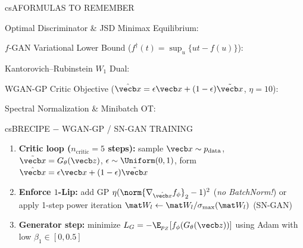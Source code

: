 \documentclass[../../../../master.tex]{subfiles}
\begin{document}
\begin{cscolumns}
\begin{cscard}{csA}{FORMULAS TO REMEMBER}
  \begin{csbul}
    \item Optimal Discriminator \& JSD Minimax Equilibrium:
    \item $f$-GAN Variational Lower Bound ($f^\dagger(t)=\sup_u\{ut-f(u)\}$):
    \item Kantorovich--Rubinstein $W_1$ Dual:
    \item WGAN-GP Critic Objective ($\hat{\vecb x}=\epsilon\vecb x+(1-\epsilon)\tilde{\vecb x}$, $\eta=10$):
    \item Spectral Normalization \& Minibatch OT:
  \end{csbul}
\end{cscard}

\begin{cscard}{csB}{RECIPE $-$ WGAN-GP / SN-GAN TRAINING}
  \begin{enumerate}[leftmargin=1.2em, itemsep=1pt, topsep=1pt, parsep=0pt]
    \item \textbf{Critic loop ($n_{\mathrm{critic}}=5$ steps):} sample $\vecb x\sim p_{\mathrm{data}}$, $\tilde{\vecb x}=G_\theta(\vecb z)$, $\epsilon\sim\Uniform(0,1)$, form $\hat{\vecb x}=\epsilon\vecb x+(1-\epsilon)\tilde{\vecb x}$
    \item \textbf{Enforce $1$-Lip:} add GP $\eta(\norm{\nabla_{\hat{\vecb x}}f_\phi}_2-1)^2$ (\emph{no BatchNorm!}) or apply 1-step power iteration $\mat W_l\leftarrow\mat W_l/\sigma_{\max}(\mat W_l)$ (SN-GAN)
    \item \textbf{Generator step:} minimize $L_G=-\E_{p_Z}[f_\phi(G_\theta(\vecb z))]$ using Adam with low $\beta_1\in[0,0.5]$
  \end{enumerate}
\end{cscard}
\columnbreak


\end{cscolumns}
\end{document}
